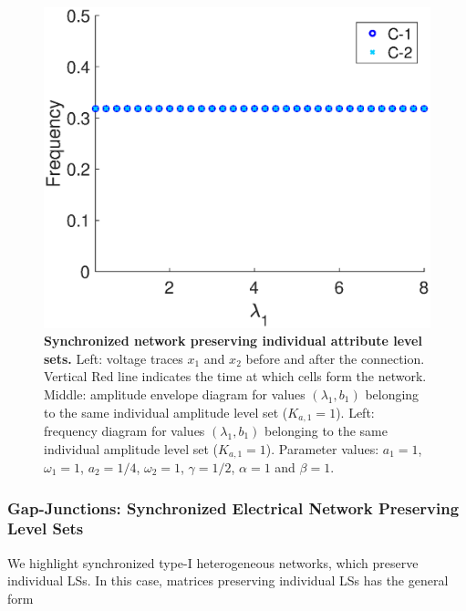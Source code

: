 \begin{figure}[htb]
\begin{minipage}{0.32\linewidth}
\begin{center}
            \end{center}
        \end{minipage} 
    \begin{minipage}{0.32\linewidth}
        \begin{center}
            \includegraphics[width=1\linewidth]{Images/photo10_3.eps}
        \end{center}
    \end{minipage} 
  
  \caption{\textbf{Synchronized network preserving individual attribute level sets.} Left: voltage traces $x_{1}$ and $x_{2}$ before and after the connection. Vertical Red line indicates the time at which cells form the network. Middle: amplitude envelope diagram for values $(\lambda_{1},b_{1})$ belonging to the same individual amplitude level set ($K_{a,1}=1$). Left: frequency diagram for values $(\lambda_{1},b_{1})$ belonging to the same individual amplitude level set ($K_{a,1}=1$). Parameter values: $a_{1} = 1$, $\omega_{1} = 1$, $a_{2}=1/4$, $\omega_{2} = 1$, $\gamma = 1/2$, $\alpha = 1$ and $\beta=1$.}
  \label{photo10}
\end{figure}

\subsubsection{Gap-Junctions: Synchronized Electrical Network Preserving Level Sets}

We highlight synchronized type-I heterogeneous networks, which preserve individual LSs. In this case, matrices preserving individual LSs has the general form

